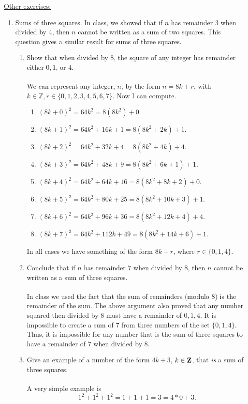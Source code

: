 \documentclass[12pt]{article}
\begin{document}
\vspace{12pt}
\underline{Other exercises:}
\vspace{-4pt}
\begin{enumerate}
	\item Sums of three squares. In class, we showed that if $n$ has remainder $3$ when divided by $4$, then $n$ cannot be written as a sum of two squares. This question gives a similar result for sums of three squares.
	\begin{enumerate}
		\item Show that when divided by $8$, the square of any integer has remainder either $0,1$, or $4$.\\\\
			We can represent any integer, $n$, by the form $n = 8k + r$, with $k \in \mathbb{Z}, r \in \{0,1,2,3,4,5,6,7\}.$  Now I can compute.
		\begin{enumerate}
			\item $(8k + 0)^2 = 64k^2 = 8(8k^2) + 0$.
			\item $(8k + 1)^2 = 64k^2 + 16k + 1 = 8(8k^2 + 2k) + 1$.
			\item $(8k + 2)^2 = 64k^2 + 32k + 4 = 8(8k^2 + 4k) + 4$.
			\item $(8k + 3)^2 = 64k^2 + 48k + 9 = 8(8k^2 + 6k + 1) + 1$.
			\item $(8k + 4)^2 = 64k^2 + 64k + 16 = 8(8k^2 + 8k + 2) + 0$.
			\item $(8k + 5)^2 = 64k^2 + 80k + 25 = 8(8k^2 + 10k + 3) + 1$.
			\item $(8k + 6)^2 = 64k^2 + 96k + 36 = 8(8k^2 + 12k + 4) + 4$.
			\item $(8k + 7)^2 = 64k^2 + 112k + 49 = 8(8k^2 + 14k + 6) + 1$.
			
		\end{enumerate} 
		In all cases we have something of the form $8k + r$, where $r \in \{0,1,4\}$.\\
		\item Conclude that if $n$ has remainder $7$ when divided by $8$, then $n$ cannot be written as a sum of three squares.\\\\
		In class we used the fact that the sum of remainders (modulo $8$) is the remainder of the sum.  The above argument also proved that any number squared then divided by 8 must have a remainder of $0,1,4$.
		It is impossible to create a sum of $7$ from three numbers of the set $\{0,1,4\}$.  Thus, it is impossible for any number that is the sum of three squares to have a remainder of $7$ when divided by $8$.\\
		\item Give an example of a number of the form $4k+3$, $k\in\mathbf{Z}$, that \textit{is} a sum of three squares.\\\\
		A very simple example is
		\begin{equation}
		1^2 + 1^2 + 1^2 = 1 + 1 + 1 = 3 = 4*0 + 3.
		\end{equation}\\
	\end{enumerate}
	

\end{enumerate}
\end{document}
